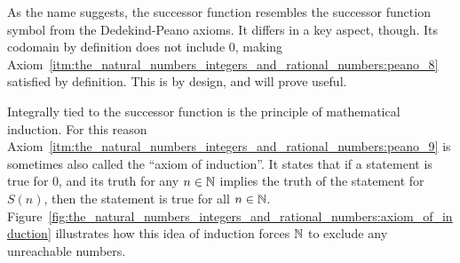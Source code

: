 \documentclass[../main.tex]{subfiles}
\begin{document}
As the name suggests, the successor function resembles the successor function symbol from the Dedekind-Peano axioms. It differs in a key aspect, though. Its codomain by definition does not include $0$, making Axiom~\ref{itm:the_natural_numbers_integers_and_rational_numbers:peano_8} satisfied by definition. This is by design, and will prove useful.

Integrally tied to the successor function is the principle of mathematical induction. For this reason Axiom~\ref{itm:the_natural_numbers_integers_and_rational_numbers:peano_9} is sometimes also called the ``axiom of induction''. It states that if a statement is true for $0$, and its truth for any $n\in\mathbb{N}$ implies the truth of the statement for $S(n)$, then the statement is true for all $n\in\mathbb{N}$. Figure~\ref{fig:the_natural_numbers_integers_and_rational_numbers:axiom_of_induction} illustrates how this idea of induction forces $\mathbb{N}$ to exclude any unreachable numbers.
\end{document}
